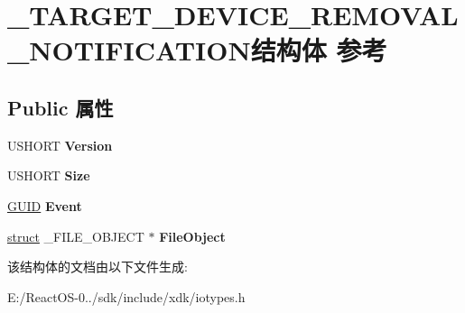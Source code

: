 \hypertarget{struct___t_a_r_g_e_t___d_e_v_i_c_e___r_e_m_o_v_a_l___n_o_t_i_f_i_c_a_t_i_o_n}{}\section{\+\_\+\+T\+A\+R\+G\+E\+T\+\_\+\+D\+E\+V\+I\+C\+E\+\_\+\+R\+E\+M\+O\+V\+A\+L\+\_\+\+N\+O\+T\+I\+F\+I\+C\+A\+T\+I\+O\+N结构体 参考}
\label{struct___t_a_r_g_e_t___d_e_v_i_c_e___r_e_m_o_v_a_l___n_o_t_i_f_i_c_a_t_i_o_n}
\subsection*{Public 属性}
\begin{DoxyCompactItemize}
\item 
\mbox{\label{struct___t_a_r_g_e_t___d_e_v_i_c_e___r_e_m_o_v_a_l___n_o_t_i_f_i_c_a_t_i_o_n_a6479345b5311a510c234352f2ae624ed}} 
U\+S\+H\+O\+RT {\bfseries Version}
\item 
\mbox{\label{struct___t_a_r_g_e_t___d_e_v_i_c_e___r_e_m_o_v_a_l___n_o_t_i_f_i_c_a_t_i_o_n_a8714e370cf9fa3ec183dc25f18f8d90f}} 
U\+S\+H\+O\+RT {\bfseries Size}
\item 
\mbox{\label{struct___t_a_r_g_e_t___d_e_v_i_c_e___r_e_m_o_v_a_l___n_o_t_i_f_i_c_a_t_i_o_n_a6d81ddf06e014461aec019bc54fc62d2}} 
\hyperlink{interface_g_u_i_d}{G\+U\+ID} {\bfseries Event}
\item 
\mbox{\label{struct___t_a_r_g_e_t___d_e_v_i_c_e___r_e_m_o_v_a_l___n_o_t_i_f_i_c_a_t_i_o_n_ab446c0475a90fbfe2b15b19459274ec2}} 
\hyperlink{interfacestruct}{struct} \+\_\+\+F\+I\+L\+E\+\_\+\+O\+B\+J\+E\+CT $\ast$ {\bfseries File\+Object}
\end{DoxyCompactItemize}


该结构体的文档由以下文件生成\+:\begin{DoxyCompactItemize}
\item 
E\+:/\+React\+O\+S-\/0../sdk/include/xdk/iotypes.\+h\end{DoxyCompactItemize}
